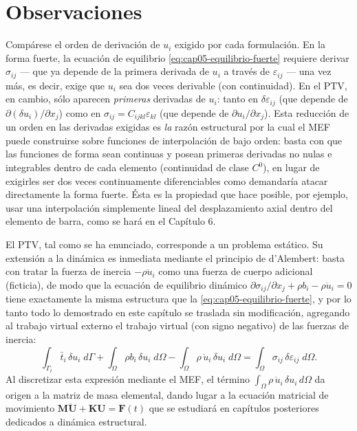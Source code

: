 \section{Observaciones}

\begin{observacion}
Compárese el orden de derivación de $u_i$ exigido por cada formulación. En la forma fuerte, la ecuación de equilibrio \eqref{eq:cap05-equilibrio-fuerte} requiere derivar $\sigma_{ij}$ --- que ya depende de la primera derivada de $u_i$ a través de $\varepsilon_{ij}$ --- una vez más, es decir, exige que $u_i$ sea dos veces derivable (con continuidad). En el PTV, en cambio, sólo aparecen \emph{primeras} derivadas de $u_i$: tanto en $\delta\varepsilon_{ij}$ (que depende de $\partial(\delta u_i)/\partial x_j$) como en $\sigma_{ij}=C_{ijkl}\varepsilon_{kl}$ (que depende de $\partial u_i/\partial x_j$). Esta reducción de un orden en las derivadas exigidas es \emph{la} razón estructural por la cual el MEF puede construirse sobre funciones de interpolación de bajo orden: basta con que las funciones de forma sean continuas y posean primeras derivadas no nulas e integrables dentro de cada elemento (continuidad de clase $C^0$), en lugar de exigirles ser dos veces continuamente diferenciables como demandaría atacar directamente la forma fuerte. Ésta es la propiedad que hace posible, por ejemplo, usar una interpolación simplemente lineal del desplazamiento axial dentro del elemento de barra, como se hará en el Capítulo 6.
\end{observacion}

\begin{observacion}
El PTV, tal como se ha enunciado, corresponde a un problema estático. Su extensión a la dinámica es inmediata mediante el principio de d'Alembert: basta con tratar la fuerza de inercia $-\rho\ddot u_i$ como una fuerza de cuerpo adicional (ficticia), de modo que la ecuación de equilibrio dinámico $\partial\sigma_{ij}/\partial x_j + \rho b_i - \rho\ddot u_i = 0$ tiene exactamente la misma estructura que la \cref{eq:cap05-equilibrio-fuerte}, y por lo tanto todo lo demostrado en este capítulo se traslada sin modificación, agregando al trabajo virtual externo el trabajo virtual (con signo negativo) de las fuerzas de inercia:
\[
\int_{\Gamma_t}\bar t_i\,\delta u_i\;d\Gamma + \int_\Omega \rho b_i\,\delta u_i\;d\Omega - \int_\Omega \rho\,\ddot u_i\,\delta u_i\;d\Omega = \int_\Omega \sigma_{ij}\,\delta\varepsilon_{ij}\;d\Omega .
\]
Al discretizar esta expresión mediante el MEF, el término $\int_\Omega \rho\,\ddot u_i\,\delta u_i\,d\Omega$ da origen a la matriz de masa elemental, dando lugar a la ecuación matricial de movimiento $\mathbf{M}\ddot{\mathbf U}+\mathbf{K}\mathbf{U}=\mathbf{F}(t)$ que se estudiará en capítulos posteriores dedicados a dinámica estructural.
\end{observacion}

